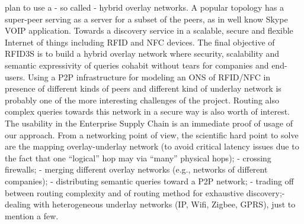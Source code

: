{plan to use a - so called - hybrid overlay networks. A popular
topology has a super-peer serving as a server for a subset of the
peers, as in well know Skype VOIP application.
%
Towards a discovery service in a scalable, secure and flexible
Internet of things including RFID and NFC devices.  The final
objective of RFID3S is to build a hybrid overlay network where
security, scalability and semantic expressivity of queries cohabit
without tears for companies and end-users. Using a P2P infrastructure
for modeling an ONS of RFID/NFC in presence of different kinds of
peers and different kind of underlay network is probably one of the
more interesting challenges of the project.  Routing also complex
queries towards this network in a secure way is also worth of
interest.
%
The usability in the Enterprise Supply Chain is an immediate proof of
usage of our approach. From a networking point of view, the scientific
hard point to solve are the mapping overlay-underlay network (to avoid
critical latency issues due to the fact that one ``logical'' hop may via
``many'' physical hops); - crossing firewalls; - merging different
overlay networks (e.g., networks of different companies); -
distributing semantic queries toward a P2P network; - trading off
between routing complexity and of routing method for exhaustive
discovery;- dealing with heterogeneous underlay networks (IP, Wifi,
Zigbee, GPRS), just to mention a few.  }





